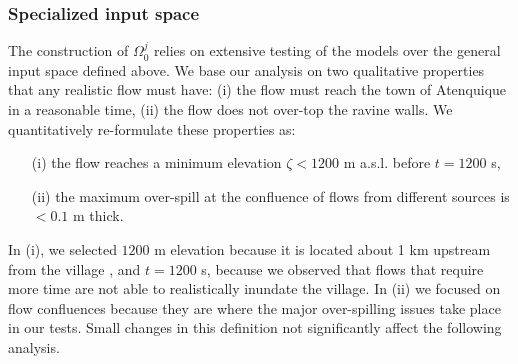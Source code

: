 \documentclass[nhess, manuscript]{copernicus}
\begin{document}
\subsubsection{Specialized input space}
The construction of $\Omega_0^j$ relies on extensive testing of the models over the general input space defined above. We base our analysis on two qualitative properties that any realistic  flow must have: (i) the flow must reach the town of Atenquique in a reasonable time, (ii) the flow does not over-top the ravine walls. We quantitatively re-formulate these properties as:
\begin{itemize}
\item[(i)] the flow reaches a minimum elevation $\zeta<1200$ m a.s.l. before $t=1200$ s,
\item[(ii)] the maximum over-spill at the confluence of flows from different sources is $<0.1$ m thick.
\end{itemize}
In (i), we selected $1200$ m elevation because it is located about 1 km upstream from the village \citep{Saucedo2008}, and $t=1200$ s, because we observed that flows that require more time are not able to realistically inundate the village. In (ii) we focused on flow confluences because they are where the major over-spilling issues take place in our tests. Small changes in this definition  not significantly affect the following analysis.
\end{document}
